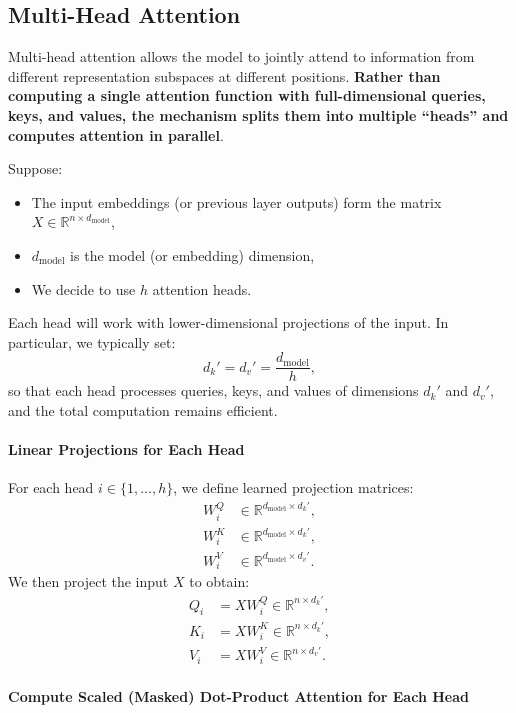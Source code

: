 \subsection{Multi-Head Attention}
Multi-head attention allows the model to jointly attend to information from different representation subspaces at different positions. \textbf{Rather than computing a single attention function with full-dimensional queries, keys, and values, the mechanism splits them into multiple ``heads'' and computes attention in parallel}. 

Suppose:
\begin{itemize}
	\item The input embeddings (or previous layer outputs) form the matrix \(X \in \mathbb{R}^{n \times d_{\text{model}}}\),
	\item \(d_{\text{model}}\) is the model (or embedding) dimension,
	\item We decide to use \(h\) attention heads.
\end{itemize}

Each head will work with lower-dimensional projections of the input. In particular, we typically set:
\[
d_k' = d_v' = \frac{d_{\text{model}}}{h},
\]
so that each head processes queries, keys, and values of dimensions \(d_k'\) and \(d_v'\), and the total computation remains efficient.

\paragraph{Linear Projections for Each Head}

   For each head \(i \in \{1, \dots, h\}\), we define learned projection matrices:
   \[
   \begin{aligned}
   W_i^Q &\in \mathbb{R}^{d_{\text{model}} \times d_k'}, \\
   W_i^K &\in \mathbb{R}^{d_{\text{model}} \times d_k'}, \\
   W_i^V &\in \mathbb{R}^{d_{\text{model}} \times d_v'}.
   \end{aligned}
   \]
   We then project the input \(X\) to obtain:
   \[
   \begin{aligned}
   Q_i &= X W_i^Q \in \mathbb{R}^{n \times d_k'}, \\
   K_i &= X W_i^K \in \mathbb{R}^{n \times d_k'}, \\
   V_i &= X W_i^V \in \mathbb{R}^{n \times d_v'}.
   \end{aligned}
   \]

\paragraph{Compute Scaled (Masked) Dot-Product Attention for Each Head}

